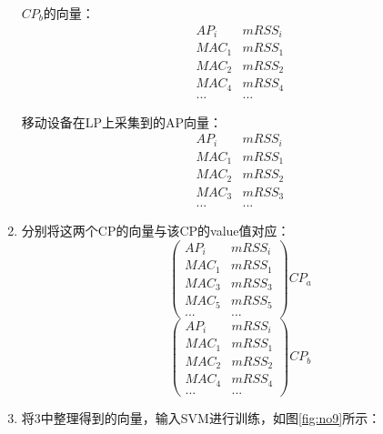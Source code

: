 \documentclass[UTF8, twocolumn ]{ctexart}
\begin{document}
\begin{enumerate}
\begin{equation}
  \end{equation}
  \par
  $CP_{b}$的向量：
  \begin{equation}
    \begin{array}{c|c}
      AP_{i} & mRSS_{i} \\ \hline
      MAC_{1} & mRSS_{1} \\
      MAC_{2} & mRSS_{2} \\
      MAC_{4} & mRSS_{4} \\
      ... & ...
    \end{array}
  \end{equation}
  \par
  移动设备在LP上采集到的AP向量：
  \begin{equation}
    \begin{array}{c|c}
      AP_{i} & mRSS_{i} \\ \hline
      MAC_{1} & mRSS_{1} \\
      MAC_{2} & mRSS_{2} \\
      MAC_{3} & mRSS_{3} \\
      ... & ...
    \end{array}
  \end{equation}
\item 分别将这两个CP的向量与该CP的value值对应：
  \begin{equation}
    \left(
    \begin{array}{c|c}
      AP_{i} & mRSS_{i} \\ \hline
      MAC_{1} & mRSS_{1} \\
      MAC_{3} & mRSS_{3} \\
      MAC_{5} & mRSS_{5} \\
      ... & ...
    \end{array}
    \right)CP_{a}
  \end{equation}
  \begin{equation}
    \left(
    \begin{array}{c|c}
      AP_{i} & mRSS_{i} \\ \hline
      MAC_{1} & mRSS_{1} \\
      MAC_{2} & mRSS_{2} \\
      MAC_{4} & mRSS_{4} \\
      ... & ...
    \end{array}
    \right)CP_{b}
  \end{equation}
\item 将3中整理得到的向量，输入SVM进行训练，如图\ref{fig:no9}所示：
  \begin{figure}[!ht]\centering

\end{figure}
\end{enumerate}
\end{document}
